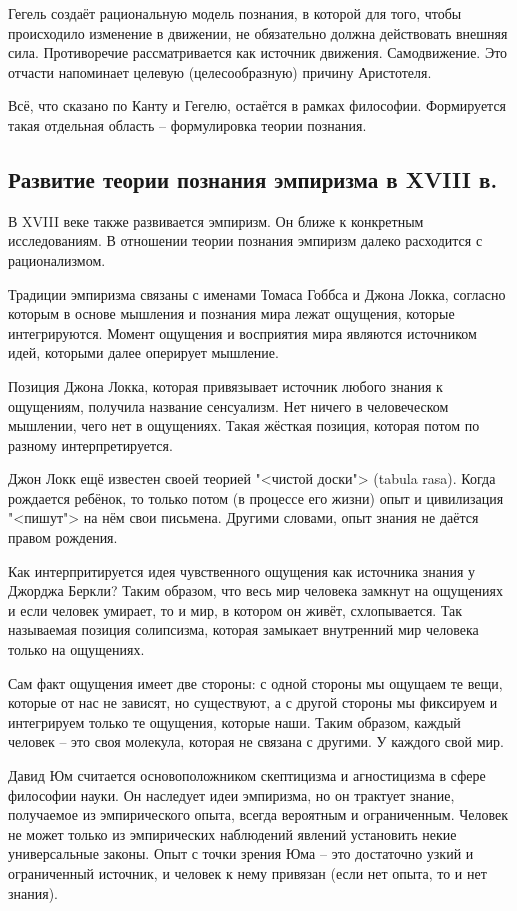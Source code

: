 \documentclass[main.tex]{subfiles}
\begin{document}
Гегель создаёт рациональную модель познания, в которой для того, чтобы происходило изменение в движении, не обязательно должна действовать внешняя сила.
Противоречие рассматривается как источник движения.
Самодвижение.
Это отчасти напоминает целевую (целесообразную) причину Аристотеля.

Всё, что сказано по Канту и Гегелю, остаётся в рамках философии.
Формируется такая отдельная область -- формулировка теории познания. 

\subsection{Развитие теории познания эмпиризма в XVIII в.}


В XVIII веке также развивается эмпиризм.
Он ближе к конкретным исследованиям.
В отношении теории познания эмпиризм далеко расходится с рационализмом.

Традиции эмпиризма связаны с именами Томаса Гоббса и Джона Локка, согласно которым в основе мышления и познания мира лежат ощущения, которые интегрируются.
Момент ощущения и восприятия мира являются источником идей, которыми далее оперирует мышление.

Позиция Джона Локка, которая привязывает источник любого знания к ощущениям, получила название сенсуализм.
Нет ничего в человеческом мышлении, чего нет в ощущениях.
Такая жёсткая позиция, которая потом по разному интерпретируется.

Джон Локк ещё известен своей теорией "<чистой доски"> (tabula rasa).
Когда рождается ребёнок, то только потом (в процессе его жизни) опыт и цивилизация "<пишут"> на нём свои письмена.
Другими словами, опыт знания не даётся правом рождения.

Как интерпритируется идея чувственного ощущения как источника знания у Джорджа Беркли?
Таким образом, что весь мир человека замкнут на ощущениях и если человек умирает, то и мир, в котором он живёт, схлопывается.
Так называемая позиция солипсизма, которая замыкает внутренний мир человека только на ощущениях.

Сам факт ощущения имеет две стороны: с одной стороны мы ощущаем те вещи, которые от нас не зависят, но существуют, а с другой стороны мы фиксируем и интегрируем только те ощущения, которые наши.
Таким образом, каждый человек -- это своя молекула, которая не связана с другими.
У каждого свой мир.

Давид Юм считается основоположником скептицизма и агностицизма в сфере философии науки.
Он наследует идеи эмпиризма, но он трактует знание, получаемое из эмпирического опыта, всегда вероятным и ограниченным.
Человек не может только из эмпирических наблюдений явлений установить некие универсальные законы.
Опыт с точки зрения Юма -- это достаточно узкий и ограниченный источник, и человек к нему привязан (если нет опыта, то и нет знания).
\end{document}
